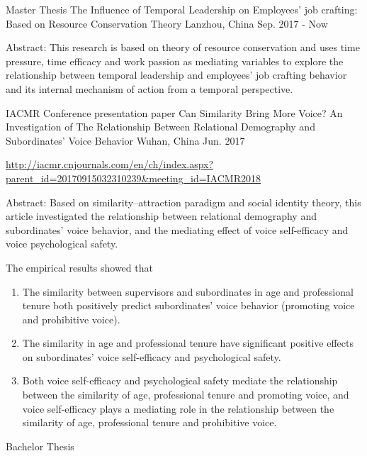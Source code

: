 \begin{cventries}
  \cventry
    {Master Thesis}
    {The Influence of Temporal Leadership on Employees' job crafting: Based on Resource Conservation Theory}
    {Lanzhou, China}
    {Sep. 2017 - Now}
    {
      \begin{cvitems}
        \item {Abstract: This research is based on theory of resource conservation and uses time pressure, time efficacy and work passion as mediating variables to explore the relationship between temporal leadership and employees’ job crafting behavior and its internal mechanism of action from a temporal perspective.}
      \end{cvitems}
     }
  \cventry
    {IACMR Conference presentation paper}
    {Can Similarity Bring More Voice? An Investigation of The Relationship Between Relational Demography and Subordinates' Voice Behavior}
    {Wuhan, China}
    {Jun. 2017}
    {
      \begin{cvitems}
	\item {\url{http://iacmr.cnjournals.com/en/ch/index.aspx?parent_id=20170915032310239&meeting_id=IACMR2018}}
        \item {Abstract: Based on similarity–attraction paradigm and social identity theory, this article investigated the relationship between relational demography and subordinates' voice behavior, and the mediating effect of voice self-efficacy and voice psychological safety.}
	\item {The empirical results showed that}
	    \begin{enumerate}
	    \item {The similarity between supervisors and subordinates in age and professional tenure both positively predict subordinates' voice behavior (promoting voice and prohibitive voice).}
	    \item {The similarity in age and professional tenure have significant positive effects on subordinates' voice self-efficacy and psychological safety.}
	    \item {Both voice self-efficacy and psychological safety mediate the relationship between the similarity of age, professional tenure and promoting voice, and voice self-efficacy plays a mediating role in the relationship between the similarity of age, professional tenure and prohibitive voice.}
	    \end{enumerate}
      \end{cvitems}
     }
  \cventry
    {Bachelor Thesis}

\end{cventries}
